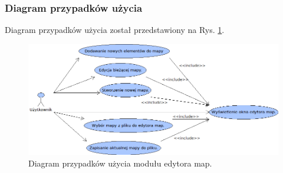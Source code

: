 \subsubsection{Diagram przypadków użycia}
\begin{par}
	Diagram przypadków użycia został przedstawiony na Rys. \ref{fig:diagram_przypadkow_mapa}.
		\begin{figure}[!h]
		\centering
		\includegraphics[width=\textwidth]{obrazki/use_case_editor.png}
		\caption{Diagram przypadków użycia modułu edytora map.}
		\label{fig:diagram_przypadkow_mapa}
		\end{figure}
		\FloatBarrier
\end{par}
